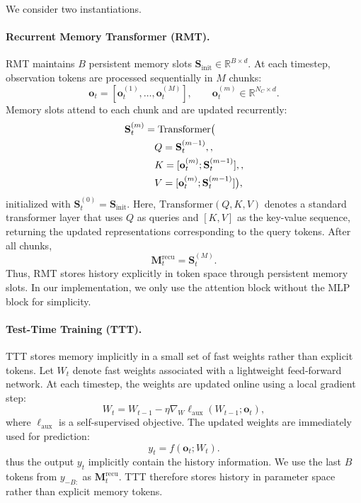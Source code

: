 We consider two instantiations.

\paragraph{Recurrent Memory Transformer (RMT).}
RMT maintains $B$ persistent memory slots
$\mathbf{S}_{\text{init}} \in \mathbb{R}^{B \times d}$.
At each timestep, observation tokens are processed sequentially in $M$ chunks:
\[
\mathbf{o}_t = [\mathbf{o}_t^{(1)}, \dots, \mathbf{o}_t^{(M)}], \qquad
\mathbf{o}_t^{(m)} \in \mathbb{R}^{N_C \times d}.
\]
Memory slots attend to each chunk and are updated recurrently:
\begin{align}
\mathbf{S}_t^{(m)}
&= \mathrm{Transformer}\big(
\notag\\
&\quad
Q=\mathbf{S}_t^{(m-1)},,
\notag
\\
&\quad
K=[\mathbf{o}_t^{(m)};\mathbf{S}_t^{(m-1)}],,
\notag\\
&\quad
V=[\mathbf{o}_t^{(m)};\mathbf{S}_t^{(m-1)}]
\big),
\end{align}
initialized with $\mathbf{S}_t^{(0)}=\mathbf{S}_{\text{init}}$.
Here, $\mathrm{Transformer}(Q, K, V)$ denotes a standard transformer layer that uses $Q$ as queries and $[K, V]$ as the key-value sequence, returning the updated representations corresponding to the query tokens.
After all chunks,
\[
\mathbf{M}_t^{\text{recu}} = \mathbf{S}_t^{(M)}.
\]
Thus, RMT stores history explicitly in token space through persistent memory slots. In our implementation, we only use the attention block without the MLP block for simplicity. 

\paragraph{Test-Time Training (TTT).}
TTT stores memory implicitly in a small set of fast weights rather than explicit tokens.
Let $W_t$ denote fast weights associated with a lightweight feed-forward network. At each timestep, the weights are updated online using a local gradient step:
\begin{equation}
W_t
=
W_{t-1}
-
\eta \nabla_W \ell_{\text{aux}}(W_{t-1}; \mathbf{o}_t),
\end{equation}
where $\ell_{\text{aux}}$ is a self-supervised objective.
The updated weights are immediately used for prediction:
\[
y_t = f(\mathbf{o}_t; W_t).
\]
thus the output $y_t$ implicitly contain the history information. 
We use the last $B$ tokens from $y_{-B:}$ as $\mathbf{M}_t^{\text{recu}}$.
TTT therefore stores history in parameter space rather than explicit memory tokens.


